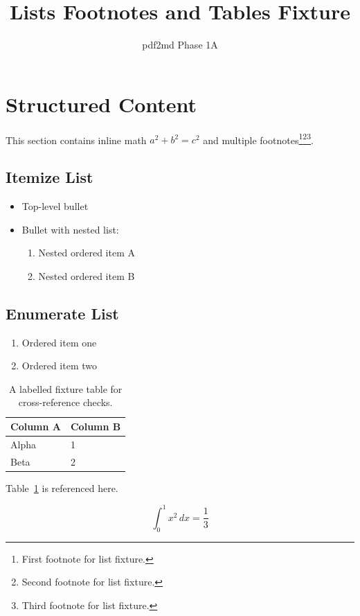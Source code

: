 \documentclass{article}
\title{Lists Footnotes and Tables Fixture}
\author{pdf2md Phase 1A}
\date{}
\begin{document}
\maketitle

\section{Structured Content}\label{sec:structured}
This section contains inline math $a^2 + b^2 = c^2$ and multiple footnotes\footnote{First footnote for list fixture.}\footnote{Second footnote for list fixture.}\footnote{Third footnote for list fixture.}.

\subsection*{Itemize List}
\begin{itemize}
  \item Top-level bullet
  \item Bullet with nested list:
  \begin{enumerate}
    \item Nested ordered item A
    \item Nested ordered item B
  \end{enumerate}
\end{itemize}

\subsection*{Enumerate List}
\begin{enumerate}
  \item Ordered item one
  \item Ordered item two
\end{enumerate}

\begin{table}[h]
\centering
\begin{tabular}{ll}
\hline
Column A & Column B \\
\hline
Alpha & 1 \\
Beta & 2 \\
\hline
\end{tabular}
\caption{A labelled fixture table for cross-reference checks.}
\label{tab:fixture-table}
\end{table}

Table~\ref{tab:fixture-table} is referenced here.

\[
\int_0^1 x^2\,dx = \frac{1}{3}
\]
\end{document}

